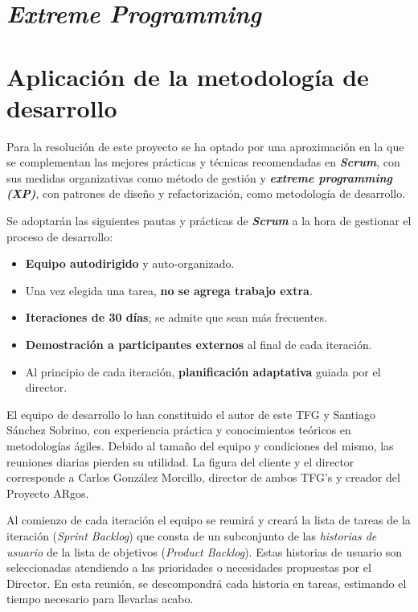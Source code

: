 \section{\textit{Extreme Programming}}
\section{Aplicación de la metodología de desarrollo}

Para la resolución de este proyecto se ha optado por una aproximación en la que se complementan las mejores prácticas y técnicas recomendadas en \textbf{\textit{Scrum}}, con sus medidas organizativas como método de gestión y \textbf{\textit{extreme programming (XP)}}, con patrones de diseño y refactorización, como metodología de desarrollo.

Se adoptarán las siguientes pautas y prácticas de \textbf{\textit{Scrum}} a la hora de gestionar el proceso de desarrollo:
\begin{itemize}
\item \textbf{Equipo autodirigido} y auto-organizado. 
\item Una vez elegida una tarea, \textbf{no se agrega trabajo extra}. %
\item \textbf{Iteraciones de 30 días}; se admite que sean más frecuentes.
\item \textbf{Demostración a participantes externos} al final de cada iteración. 
\item Al principio de cada iteración, \textbf{planificación adaptativa} guiada por el director.
\end{itemize}

El  equipo  de  desarrollo  lo  han constituido el autor de este TFG y Santiago Sánchez Sobrino, con  experiencia  práctica y conocimientos teóricos en metodologías ágiles. Debido  al  tamaño  del  equipo  y  condiciones  del  mismo,  las  reuniones  diarias pierden su utilidad. La figura del cliente y el director corresponde a Carlos González Morcillo, director de ambos TFG's y creador del Proyecto ARgos. 

Al comienzo de cada iteración el equipo se reunirá y creará la lista de tareas de la iteración (\textit{Sprint Backlog}) que consta de un subconjunto de las \textit{historias de usuario} de la lista de objetivos (\textit{Product Backlog}). Estas historias de usuario son seleccionadas atendiendo a las prioridades o necesidades propuestas por el Director. En esta reunión, se descompondrá cada historia en tareas, estimando el tiempo necesario para llevarlas acabo. 

